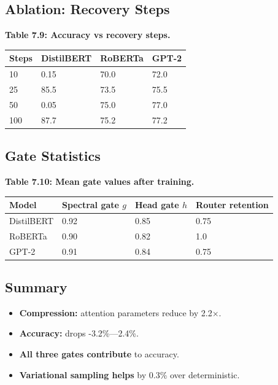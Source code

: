 \subsection{Ablation: Recovery Steps}

\textbf{Table 7.9: Accuracy vs recovery steps.}

\begin{table}[H]
\centering
\small
\begin{tabular}{llll}
\toprule
\textbf{Steps} & \textbf{DistilBERT} & \textbf{RoBERTa} & \textbf{GPT-2} \\
\midrule
10 & 0.15 & 70.0 & 72.0 \\
25 & 85.5 & 73.5 & 75.5 \\
50 & 0.05 & 75.0 & 77.0 \\
100 & 87.7 & 75.2 & 77.2 \\
\bottomrule
\end{tabular}
\end{table}

\subsection{Gate Statistics}

\textbf{Table 7.10: Mean gate values after training.}

\begin{table}[H]
\centering
\small
\begin{tabular}{llll}
\toprule
\textbf{Model} & \textbf{Spectral gate $g$} & \textbf{Head gate $h$} & \textbf{Router retention} \\
\midrule
DistilBERT & 0.92 & 0.85 & 0.75 \\
RoBERTa & 0.90 & 0.82 & 1.0 \\
GPT-2 & 0.91 & 0.84 & 0.75 \\
\bottomrule
\end{tabular}
\end{table}

\subsection{Summary}

\begin{itemize}
\item \textbf{Compression:} attention parameters reduce by 2.2$\times$.
\item \textbf{Accuracy:} drops -3.2\%---2.4\%.
\item \textbf{All three gates contribute} to accuracy.
\item \textbf{Variational sampling helps} by 0.3\% over deterministic.

\end{itemize}


